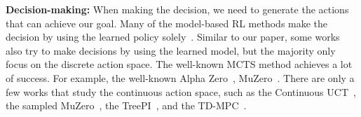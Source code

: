 \documentclass{article} %
\newcommand{\yue}[1]{ {#1}}
\begin{document}

\textbf{Decision-making:}
When making the decision, we need to generate the actions that can achieve our goal. Many of the model-based RL methods make the decision by using the learned policy solely~\citep{hafner2021mastering}. 
Similar to our paper, some works also try to make decisions by using the learned model, but the majority   only focus on the discrete action space. The well-known MCTS method achieves a lot of success. For example, the well-known Alpha Zero~\citep{silver2017mastering}, MuZero~\citep{schrittwieser2020mastering}.
There are only a few works that study the continuous action space, such as the Continuous UCT~\citep{couetoux2011continuous}, the sampled MuZero~\citep{hubert2021learning}, \yue{the TreePI~\citep{springenberg2020local},} and the TD-MPC~\citep{hansen2022temporal}.
\end{document}
